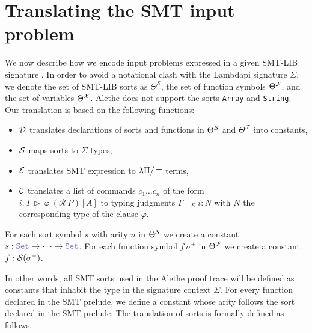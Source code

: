 \section{Translating the SMT input problem}

We now describe how we encode input problems expressed in a given
SMT-LIB signature \cite[\S 5.2.1]{smtlib}. In order to avoid a notational clash with the Lambdapi signature $\Sigma$, we denote the set of SMT-LIB sorts as $\Theta^\mathcal{S}$, the set of function symbols $\Theta^\cal{F}$, and the set of variables $\Theta^\cal{X}$.
Alethe does not support the sorts \texttt{Array} and \texttt{String}. Our translation is based on the following functions:
\begin{itemize}
\item $\cal{D}$ translates declarations of sorts and functions in $\Theta^\cal{S}$ and $\Theta^\mathcal{F}$ into constants,
\item $\cal{S}$ maps sorts to $\Sigma$ types,
\item $\cal{E}$ translates SMT expression to $\lpm$ terms,
\item $\cal{C}$ translates a list of commands  $c_1 \dots c_n$ of the form\\
  $i.~\Gamma \triangleright~\varphi~(\mathcal{R}~P)[A]$ to typing judgments $\Gamma \vdash_\Sigma i : N$ with $N$ the corresponding type of the clause $\varphi$.
\end{itemize}

\smallskip

\begin{definition}
For each sort symbol $s$ with arity $n$ in $\Theta^\cal{S}$ we create a constant $s: \set \ra \dots \ra \set$.
For each function symbol $f~\sigma^+$ in $\Theta^\cal{F}$ we create a constant $f: \cal{S}(\sigma^+)$.
\end{definition}

\smallskip

In other words, all SMT sorts used in the Alethe proof trace will be defined as constants that inhabit the type \set{} in the signature context $\Sigma$.
For every function declared in the SMT prelude, we define a constant whose arity follows the sort declared in the SMT prelude. The translation of sorts is formally defined as follows.

\smallskip

